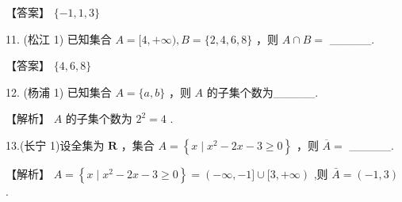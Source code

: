 \documentclass[10pt]{article}
\begin{document}
【答案】 \(\{  - 1,1,3\}\)

11. (松江 1) 已知集合 \(A = \lbrack 4, + \infty ),B = \{ 2,4,6,8\}\) ，则 \(A \cap  B =\) \_\_\_\_\_.

【答案】 \(\{ 4,6,8\}\)

12. (杨浦 1) 已知集合 \(A = \{ a,b\}\) ，则 \(A\) 的子集个数为\_\_\_\_\_.

【解析】 \(A\) 的子集个数为 \({2}^{2} = 4\) .

13.(长宁 1)设全集为 \(\mathbf{R}\) ，集合 \(A = \left\{  {x \mid  {x}^{2} - {2x} - 3 \geq  0}\right\}\) ，则 \(\overline{A} =\) \_\_\_\_\_.

【解析】 \(A = \left\{  {x \mid  {x}^{2} - {2x} - 3 \geq  0}\right\}   = \left( {-\infty , - 1\rbrack \cup \lbrack 3, + \infty }\right)\) ,则 \(\bar{A} = \left( {-1,3}\right)\) .
\end{document}
